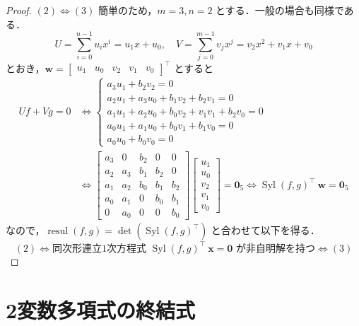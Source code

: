 \documentclass[12pt, uplatex, dvipdfmx]{jsarticle}
\theoremstyle{definition}
\DeclareMathOperator{\Syl}{Syl}
\DeclareMathOperator{\resul}{resul}
\begin{document}
\begin{proof}
  $(2) \Leftrightarrow (3)$ 簡単のため，$m=3, n=2$
  とする．一般の場合も同様である．
  \[
    U= \sum_{i=0}^{n-1} u_i x^i=u_1 x + u_0, \quad V= \sum_{j=0}^{m-1} v_j x^j=v_2 x^2+v_1 x + v_0
  \]
  とおき，$\bm{w} = \left[
    \begin{array}{ccccc}
      u_1 & u_0 & v_2 & v_1 & v_0
    \end{array}
    \right]^{\top}$ とすると
  \[
    \begin{aligned}
      Uf+Vg=0 &\Leftrightarrow
      \begin{cases}
        a_3u_1 + b_2v_2=0\\
        a_2u_1+a_3u_0+b_1v_2+b_2v_1=0\\
        a_1u_1+a_2u_0+b_0v_2+v_1v_1+b_2v_0=0\\
        a_0u_1+a_1u_0+b_0v_1+b_1v_0=0\\
        a_0u_0+b_0v_0=0
      \end{cases}\\
      & \Leftrightarrow \left[
        \begin{array}{ccccc}
          a_3 & 0 & b_2 & 0 & 0\\
          a_2 & a_3 & b_1 & b_2 & 0\\
          a_1 & a_2 & b_0 & b_1 & b_2\\
          a_0 & a_1 & 0 & b_0 & b_1\\
          0 & a_0 & 0 & 0 & b_0
        \end{array}
      \right] \left[
        \begin{array}{c}
          u_1\\
          u_0\\
          v_2\\
          v_1\\
          v_0
        \end{array}
      \right] = \bm{0}_5
      \Leftrightarrow \Syl(f,g)^{\top} ~\bm{w}= \bm{0}_5
    \end{aligned}
  \]
  なので，$\resul(f,g) = \det\left(\Syl(f,g)^{\top}\right)$ と合わせて以下を得る．
  \[
    (2) \Leftrightarrow \text{同次形連立1次方程式 } \Syl(f,g)^{\top}~\bm{x}=\bm{0} \text{ が非自明解を持つ}
    \Leftrightarrow (3)
  \]
\end{proof}







\newpage

\section{2変数多項式の終結式}
\end{document}
